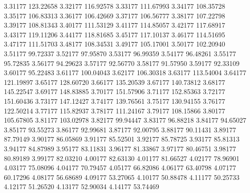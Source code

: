       3.31177    123.22658    
      3.32177    116.92578    
      3.33177    111.67993    
      3.34177    108.35728    
      3.35177    106.83313    
      3.36177    106.42669    
      3.37177    106.56777    
      3.38177    107.22798    
      3.39177    108.81343    
      3.40177    111.53129    
      3.41177    114.85057    
      3.42177    117.68917    
      3.43177    119.11206    
      3.44177    118.81685    
      3.45177    117.10137    
      3.46177    114.51695    
      3.47177    111.51703    
      3.48177    108.34531    
      3.49177    105.17001    
      3.50177    102.20940    
      3.51177     99.72337    
      3.52177     97.95870    
      3.53177     96.99359    
      3.54177     96.48261    
      3.55177     95.72835    
      3.56177     94.29623    
      3.57177     92.56770    
      3.58177     91.57950    
      3.59177     92.33109    
      3.60177     95.22483    
      3.61177    100.04043    
      3.62177    106.30318    
      3.63177    113.54004    
      3.64177    121.19897    
      3.65177    128.60720    
      3.66177    135.20539    
      3.67177    140.73812    
      3.68177    145.22547    
      3.69177    148.83885    
      3.70177    151.57906    
      3.71177    152.85363    
      3.72177    151.60436    
      3.73177    147.12427    
      3.74177    139.76561    
      3.75177    130.94155    
      3.76177    122.50214    
      3.77177    115.82937    
      3.78177    111.24167    
      3.79177    108.15866    
      3.80177    105.67805    
      3.81177    103.02978    
      3.82177     99.94447    
      3.83177     96.88218    
      3.84177     94.65027    
      3.85177     93.55273    
      3.86177     92.99681    
      3.87177     92.00795    
      3.88177     90.11431    
      3.89177     87.79149    
      3.90177     86.05869    
      3.91177     85.52501    
      3.92177     85.78725    
      3.93177     85.81313    
      3.94177     84.87989    
      3.95177     83.11831    
      3.96177     81.33867    
      3.97177     80.46751    
      3.98177     80.89189    
      3.99177     82.03210    
      4.00177     82.63130    
      4.01177     81.66527    
      4.02177     78.96901    
      4.03177     75.08096    
      4.04177     70.79457    
      4.05177     66.82086    
      4.06177     63.40798    
      4.07177     60.17296    
      4.08177     56.68689    
      4.09177     53.27065    
      4.10177     50.88478    
      4.11177     50.25733    
      4.12177     51.26520    
      4.13177     52.90034    
      4.14177     53.74469    
